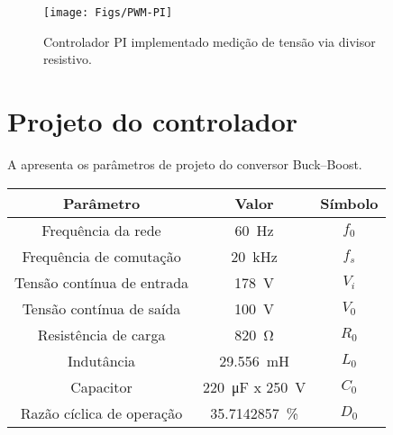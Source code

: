 \begin{figure}[!h]
	\centering
	\texttt{[image: Figs/PWM-PI]}
	\caption{Controlador PI implementado medição de tensão via divisor resistivo.}
	\label{fig:PI-PWM}
\end{figure}



\section{Projeto do controlador}

A  apresenta os parâmetros de projeto do conversor Buck--Boost.

\begin{center}
	\label{tab:parametrosBuckBoost}
	\begin{tabular}{@{}ccc@{}}
		\toprule
		\textbf{Parâmetro} & \textbf{Valor} & \textbf{Símbolo} \\ \midrule			
		Frequência  da rede        & \SI{60}{\hertz}     & $f_0$  \\		
		Frequência de comutação        & \SI{20}{\kilo\hertz}     & $f_s$  \\	
		Tensão contínua de entrada         &  \SI{178}{\V}      & $V_i$  \\
		Tensão contínua de saída         &  \SI{100}{\V}      & $V_0$  \\
		Resistência de carga        & \SI{820}{\ohm}      & $R_0$  \\
			Indutância        & \SI{29.556}{\milli\henry}     & $L_0$  \\
			Capacitor           & \SI{220}{\micro\farad} x \SI{250}{\V}      & $C_0$               \\
		Razão cíclica de operação       & \SI{35.7142857}{\%}    & $D_{0}$    \\  \bottomrule	
	\end{tabular}
\end{center}




